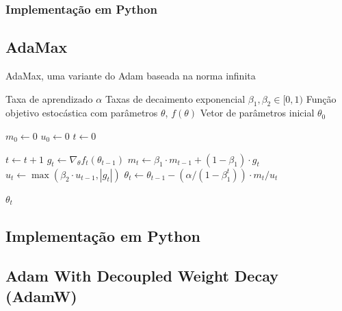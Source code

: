 \subsubsection{Implementação em Python}

\subsection{AdaMax}

\begin{algorithm}[H] %
    \caption{AdaMax, uma variante do Adam baseada na norma infinita}
    \label{alg:adamax}
    \begin{algorithmic}[1] %

    \Require Taxa de aprendizado $\alpha$
    \Require Taxas de decaimento exponencial $\beta_1, \beta_2 \in [0, 1)$
    \Require Função objetivo estocástica com parâmetros $\theta$, $f(\theta)$
    \Require Vetor de parâmetros inicial $\theta_0$

    \State $m_0 \leftarrow 0$ 
    \State $u_0 \leftarrow 0$ 
    \State $t \leftarrow 0$ 

        \State $t \leftarrow t + 1$
        \State $g_t \leftarrow \nabla_\theta f_t(\theta_{t-1})$ 
        \State $m_t \leftarrow \beta_1 \cdot m_{t-1} + (1 - \beta_1) \cdot g_t$ 
        \State $u_t \leftarrow \max(\beta_2 \cdot u_{t-1}, |g_t|)$ 
        \State $\theta_t \leftarrow \theta_{t-1} - (\alpha / (1 - \beta_1^t)) \cdot m_t / u_t$ 
    \EndWhile

    \State \Return $\theta_t$ 
    \end{algorithmic}
\end{algorithm}

\subsection{Implementação em Python}

\subsection{Adam With Decoupled Weight Decay (AdamW)}

